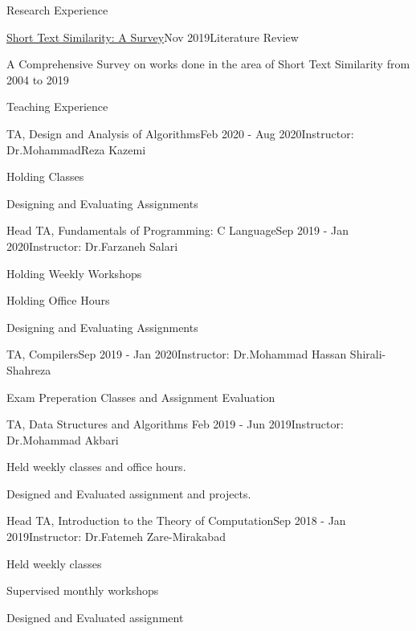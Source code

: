 \documentclass{resume} %
\begin{document}
	\begin{rSection}{Research Experience}
		
			\begin{rSubsection}{\href{https://www.researchgate.net/publication/337632914_Short_Text_Similarity_A_Survey}{\textcolor{coolblack}{Short Text Similarity: A Survey}}}{Nov 2019}{Literature Review}{ }
		\item A Comprehensive Survey on works done in the area of Short Text Similarity from 2004 to 2019
	\end{rSubsection}
	\end{rSection}
	\begin{rSection}{Teaching Experience}
		\begin{rSubsection}{TA, Design and Analysis of Algorithms}{Feb 2020 - Aug 2020}{Instructor: Dr.MohammadReza Kazemi}{ }
		\item Holding Classes
		\item Designing and Evaluating Assignments
		\end{rSubsection}				
		\begin{rSubsection}{Head TA, Fundamentals of Programming: C Language}{Sep 2019 - Jan 2020}{Instructor: Dr.Farzaneh Salari}{ }
		\item Holding Weekly Workshops
		\item Holding Office Hours
		\item Designing and Evaluating Assignments
		
		\end{rSubsection}					%
		\begin{rSubsection}{TA, Compilers}{Sep 2019 - Jan 2020}{Instructor: Dr.Mohammad Hassan Shirali-Shahreza}{ }
		\item Exam Preperation Classes and Assignment Evaluation
		\end{rSubsection}					%
		\begin{rSubsection}{TA, Data Structures and Algorithms }{Feb 2019 - Jun 2019}{Instructor: Dr.Mohammad Akbari}{ }
			\item 
			Held weekly classes and office hours.
			\item 
			Designed and Evaluated assignment and projects.\\
		\end{rSubsection}
		\begin{rSubsection}{Head TA, Introduction to the Theory of Computation}{Sep 2018 - Jan 2019}{Instructor: Dr.Fatemeh Zare-Mirakabad}{ }
			\item Held weekly classes 
			\item Supervised monthly workshops
			\item Designed and Evaluated assignment 		
		\end{rSubsection}
		
	\end{rSection}
\end{document}
